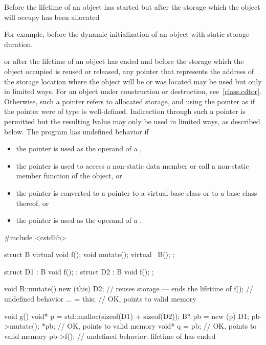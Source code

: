 \pnum
Before the lifetime of an object has started but after the storage which
the object will occupy has been allocated
\begin{footnote}
For example, before the dynamic initialization of
an object with static storage duration.
\end{footnote}
or after the lifetime of an object has ended and before the storage
which the object occupied is reused or released, any pointer that represents the address of
the storage location where the object will be or was located may be
used but only in limited ways.
For an object under construction or destruction, see~\ref{class.cdtor}.
Otherwise, such
a pointer refers to allocated
storage, and using the pointer as
if the pointer were of type  is
well-defined. Indirection through such a pointer is permitted but the resulting lvalue may only be used in
limited ways, as described below. The
program has undefined behavior if
\begin{itemize}
\item
  the pointer is used as the operand of a ,
\item
  the pointer is used to access a non-static data member or call a
  non-static member function of the object, or
\item
  the pointer is converted to a pointer
  to a virtual base class or to a base class thereof, or
\item
  the pointer is used as the operand of a
  .
\end{itemize}
\begin{example}
\begin{codeblock}
#include <cstdlib>

struct B {
  virtual void f();
  void mutate();
  virtual ~B();
};

struct D1 : B { void f(); };
struct D2 : B { void f(); };

void B::mutate() {
  new (this) D2;    // reuses storage --- ends the lifetime of 
  f();              // undefined behavior
  ... = this;       // OK,  points to valid memory
}

void g() {
  void* p = std::malloc(sizeof(D1) + sizeof(D2));
  B* pb = new (p) D1;
  pb->mutate();
  *pb;              // OK,  points to valid memory
  void* q = pb;     // OK,  points to valid memory
  pb->f();          // undefined behavior: lifetime of  has ended
}
\end{codeblock}
\end{example}

